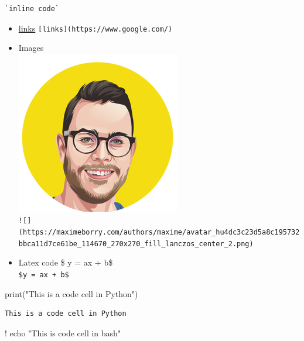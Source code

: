 \documentclass[
  letterpaper,
]{book}
\newenvironment{Shaded}{}{}
\newcommand{\BuiltInTok}[1]{\textcolor[rgb]{0.84,0.23,0.29}{#1}}
\newcommand{\NormalTok}[1]{\textcolor[rgb]{0.14,0.16,0.18}{#1}}
\newcommand{\OperatorTok}[1]{\textcolor[rgb]{0.14,0.16,0.18}{#1}}
\newcommand{\StringTok}[1]{\textcolor[rgb]{0.01,0.18,0.38}{#1}}
\begin{document}
\begin{verbatim}
`inline code`
\end{verbatim}

\begin{itemize}
\item
  \href{https://www.google.com/}{links}
  \texttt{{[}links{]}(https://www.google.com/)}
\item
  Images\\
  \includegraphics{assets/images/chapters/introduction-to-python/avatar_hu4dc3c23d5a8c195732bbca11d7ce61be_114670_270x270_fill_lanczos_center_2.png}\\
  \texttt{!{[}{]}(https://maximeborry.com/authors/maxime/avatar\_hu4dc3c23d5a8c195732bbca11d7ce61be\_114670\_270x270\_fill\_lanczos\_center\_2.png)}
\item
  Latex code \$ y = ax + b\$\\
  \texttt{\$y\ =\ ax\ +\ b\$}
\end{itemize}

\begin{Shaded}
\begin{Highlighting}[]
\BuiltInTok{print}\NormalTok{(}\StringTok{"This is a code cell in Python"}\NormalTok{)}
\end{Highlighting}
\end{Shaded}

\begin{verbatim}
This is a code cell in Python
\end{verbatim}

\begin{Shaded}
\begin{Highlighting}[]
\OperatorTok{!}\NormalTok{ echo }\StringTok{"This is code cell in bash"}
\end{Highlighting}
\end{Shaded}
\end{document}
